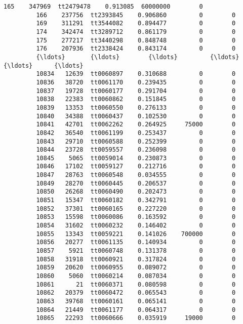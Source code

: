 \documentclass[11pt]{article}
\begin{document}
\begin{Verbatim}[commandchars=\\\{\}]
         165    347969  tt2479478    0.913085  60000000        0   
         166    237756  tt2393845    0.906860         0        0   
         169    311291  tt3544082    0.894477         0        0   
         174    342474  tt3289712    0.861179         0        0   
         175    277217  tt3440298    0.848748         0        0   
         176    207936  tt2338424    0.843174         0        0   
         {\ldots}       {\ldots}        {\ldots}         {\ldots}       {\ldots}      {\ldots}   
         10834   12639  tt0060897    0.310688         0        0   
         10836   38720  tt0061170    0.239435         0        0   
         10837   19728  tt0060177    0.291704         0        0   
         10838   22383  tt0060862    0.151845         0        0   
         10839   13353  tt0060550    0.276133         0        0   
         10840   34388  tt0060437    0.102530         0        0   
         10841   42701  tt0062262    0.264925     75000        0   
         10842   36540  tt0061199    0.253437         0        0   
         10843   29710  tt0060588    0.252399         0        0   
         10844   23728  tt0059557    0.236098         0        0   
         10845    5065  tt0059014    0.230873         0        0   
         10846   17102  tt0059127    0.212716         0        0   
         10847   28763  tt0060548    0.034555         0        0   
         10849   28270  tt0060445    0.206537         0        0   
         10850   26268  tt0060490    0.202473         0        0   
         10851   15347  tt0060182    0.342791         0        0   
         10852   37301  tt0060165    0.227220         0        0   
         10853   15598  tt0060086    0.163592         0        0   
         10854   31602  tt0060232    0.146402         0        0   
         10855   13343  tt0059221    0.141026    700000        0   
         10856   20277  tt0061135    0.140934         0        0   
         10857    5921  tt0060748    0.131378         0        0   
         10858   31918  tt0060921    0.317824         0        0   
         10859   20620  tt0060955    0.089072         0        0   
         10860    5060  tt0060214    0.087034         0        0   
         10861      21  tt0060371    0.080598         0        0   
         10862   20379  tt0060472    0.065543         0        0   
         10863   39768  tt0060161    0.065141         0        0   
         10864   21449  tt0061177    0.064317         0        0   
         10865   22293  tt0060666    0.035919     19000        0   
         

\end{Verbatim}
\end{document}
